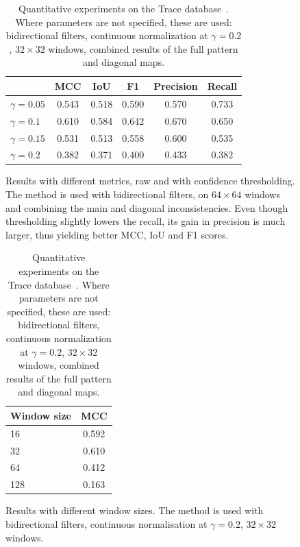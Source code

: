 \documentclass{ipol}
\begin{document}
\begin{table}[ht]
        \begin{subfigure}[b]{.56\linewidth}
                \centering
                \begin{tabular}{lccccc}
                        \toprule
                        &MCC&IoU&F1&\scriptsize Precision&\scriptsize Recall\\
                        \midrule
                        \scriptsize $\gamma=0.05$ & 0.543 & 0.518 & 0.590 & 0.570 & 0.733\\
                        \scriptsize $\gamma=0.1$ & 0.610 & 0.584 & 0.642 & 0.670 & 0.650\\
                        \scriptsize $\gamma=0.15$ & 0.531 & 0.513 & 0.558 & 0.600 & 0.535\\
                        \scriptsize $\gamma=0.2$ & 0.382&0.371&0.400&0.433&0.382\\
                        \bottomrule
                \end{tabular}
                \caption{Results with different metrics, raw and with confidence thresholding. The method is used with bidirectional filters, on $64\times64$ windows and combining the main and diagonal inconsistencies. Even though thresholding slightly lowers the recall, its gain in precision is much larger, thus yielding better MCC, IoU and F1 scores.}
        \end{subfigure}\hfill%
        \begin{subfigure}[b]{.4\linewidth}
                \centering
                \begin{tabular}{lc}
                        \toprule
                        \scriptsize Window size & MCC\\
                        \midrule
                        16 & 0.592\\
                        32 & 0.610\\
                        64 & 0.412\\
                        128 & 0.163\\
                        \bottomrule
                \end{tabular}
                \caption{Results with different window sizes. The method is used with bidirectional filters, continuous normalisation at $\gamma=0.2$, $32\times32$ windows.}
        \end{subfigure}
        \caption{Quantitative experiments on the Trace database~\cite{trace}. Where parameters are not specified, these are used: bidirectional filters, continuous normalization at $\gamma=0.2$, $32\times32$ windows, combined results of the full pattern and diagonal maps.}
        \label{tab:quantitative}
\end{table}
\end{document}
